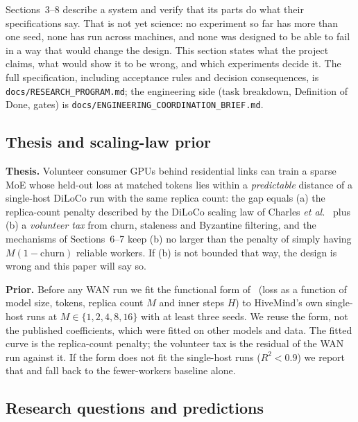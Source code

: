 \documentclass[11pt,a4paper]{article}
\begin{document}
Sections~3--8 describe a system and verify that its parts do what their specifications say. That is not yet science: no experiment so far has more than one seed, none has run across machines, and none was designed to be able to fail in a way that would change the design. This section states what the project claims, what would show it to be wrong, and which experiments decide it. The full specification, including acceptance rules and decision consequences, is \texttt{docs/RESEARCH\_PROGRAM.md}; the engineering side (task breakdown, Definition of Done, gates) is \texttt{docs/ENGINEERING\_COORDINATION\_BRIEF.md}.

\subsection{Thesis and scaling-law prior}

\textbf{Thesis.} Volunteer consumer GPUs behind residential links can train a sparse MoE whose held-out loss at matched tokens lies within a \emph{predictable} distance of a single-host DiLoCo run with the same replica count: the gap equals (a) the replica-count penalty described by the DiLoCo scaling law of Charles \textit{et al.}~\cite{charles2025scalingdiloco} plus (b) a \emph{volunteer tax} from churn, staleness and Byzantine filtering, and the mechanisms of Sections~6--7 keep (b) no larger than the penalty of simply having $M(1-\text{churn})$ reliable workers. If (b) is not bounded that way, the design is wrong and this paper will say so.

\textbf{Prior.} Before any WAN run we fit the functional form of~\cite{charles2025scalingdiloco} (loss as a function of model size, tokens, replica count $M$ and inner steps $H$) to HiveMind's own single-host runs at $M \in \{1,2,4,8,16\}$ with at least three seeds. We reuse the form, not the published coefficients, which were fitted on other models and data. The fitted curve is the replica-count penalty; the volunteer tax is the residual of the WAN run against it. If the form does not fit the single-host runs ($R^2 < 0.9$) we report that and fall back to the fewer-workers baseline alone.

\subsection{Research questions and predictions}
\end{document}
